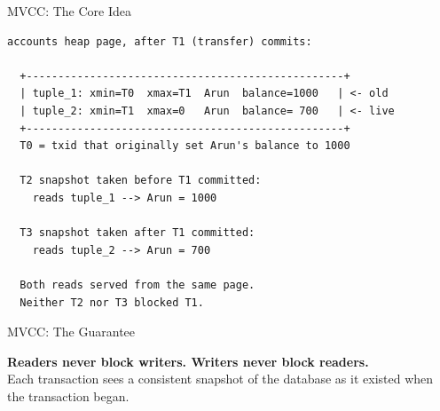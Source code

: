 \documentclass[aspectratio=169,10pt]{beamer}
\begin{document}
\begin{frame}[fragile]{MVCC: The Core Idea}

\begin{lstlisting}[style=ascii]
  accounts heap page, after T1 (transfer) commits:

  +--------------------------------------------------+
  | tuple_1: xmin=T0  xmax=T1  Arun  balance=1000   | <- old
  | tuple_2: xmin=T1  xmax=0   Arun  balance= 700   | <- live
  +--------------------------------------------------+
  T0 = txid that originally set Arun's balance to 1000

  T2 snapshot taken before T1 committed:
    reads tuple_1 --> Arun = 1000

  T3 snapshot taken after T1 committed:
    reads tuple_2 --> Arun = 700

  Both reads served from the same page.
  Neither T2 nor T3 blocked T1.
\end{lstlisting}

\end{frame}

\begin{frame}{MVCC: The Guarantee}

  \begin{block}{}
    \textbf{Readers never block writers.
    Writers never block readers.}\\[0.4em]
    Each transaction sees a consistent snapshot of the database
    as it existed when the transaction began.
  \end{block}

\end{frame}
\end{document}
